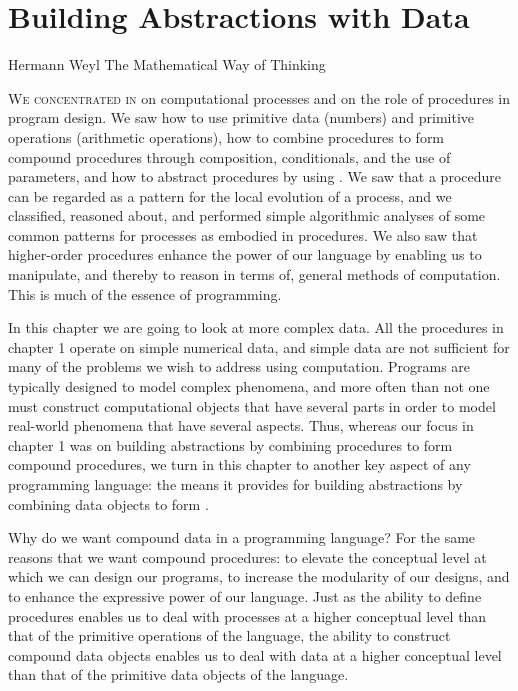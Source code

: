 \chapter{Building Abstractions with Data}
\label{Chapter 2}

  {Hermann Weyl}
  {The Mathematical Way of Thinking}
  {}

\noindent
\lettrine{W}{e concentrated in}  on computational processes and on the role
of procedures in program design.  We saw how to use primitive data (numbers)
and primitive operations (arithmetic operations), how to combine procedures to
form compound procedures through composition, conditionals, and the use of
parameters, and how to abstract procedures by using .  We saw that
a procedure can be regarded as a pattern for the local evolution of a process,
and we classified, reasoned about, and performed simple algorithmic analyses of
some common patterns for processes as embodied in procedures.  We also saw that
higher-order procedures enhance the power of our language by enabling us to
manipulate, and thereby to reason in terms of, general methods of computation.
This is much of the essence of programming.

In this chapter we are going to look at more complex data.  All the procedures
in chapter 1 operate on simple numerical data, and simple data are not
sufficient for many of the problems we wish to address using computation.
Programs are typically designed to model complex phenomena, and more often than
not one must construct computational objects that have several parts in order
to model real-world phenomena that have several aspects.  Thus, whereas our
focus in chapter 1 was on building abstractions by combining procedures
to form compound procedures, we turn in this chapter to another key aspect of
any programming language: the means it provides for building abstractions by
combining data objects to form .

Why do we want compound data in a programming language?  For the same reasons
that we want compound procedures: to elevate the conceptual level at which we
can design our programs, to increase the modularity of our designs, and to
enhance the expressive power of our language.  Just as the ability to define
procedures enables us to deal with processes at a higher conceptual level than
that of the primitive operations of the language, the ability to construct
compound data objects enables us to deal with data at a higher conceptual level
than that of the primitive data objects of the language.

